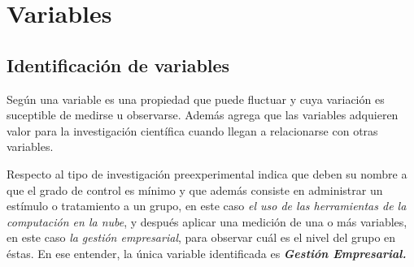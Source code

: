 \section{Variables}

\subsection{Identificación de variables}
Según \cite{sampieri} una variable es una propiedad que puede fluctuar y cuya
variación es suceptible de medirse u observarse. Además agrega que las variables
adquieren valor para la investigación científica cuando llegan a relacionarse
con otras variables.

Respecto al tipo de investigación preexperimental \cite{sampieri} indica que deben
su nombre a que el grado de control es mínimo y que además consiste en administrar
un estímulo o tratamiento a un grupo, en este caso \emph{el uso de las herramientas
de la computación en la nube}, y después aplicar una medición de una o más
variables, en este caso \emph{la gestión empresarial}, para observar cuál es
el nivel del grupo  en éstas. En ese entender, la única variable identificada es
\emph{\textbf{Gestión Empresarial.}}
